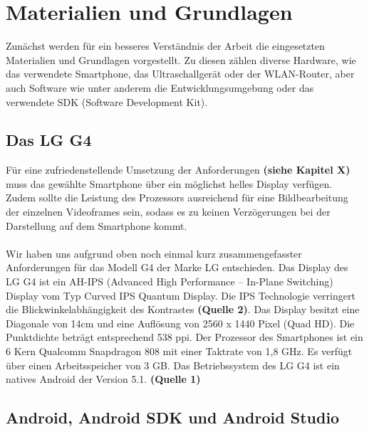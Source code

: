 \chapter{Materialien und Grundlagen}

Zunächst werden für ein besseres Verständnis der Arbeit die eingesetzten Materialien und Grundlagen vorgestellt. Zu diesen zählen diverse Hardware, wie das verwendete Smartphone, das Ultraschallgerät oder der WLAN-Router, aber auch Software wie unter anderem die Entwicklungsumgebung oder das verwendete SDK (Software Development Kit). 

\section{Das LG G4}

Für eine zufriedenstellende Umsetzung der Anforderungen \textbf{(siehe Kapitel X)} muss das gewählte Smartphone über ein möglichst helles Display verfügen. Zudem sollte die Leistung des Prozessors ausreichend für eine Bildbearbeitung der einzelnen Videoframes sein, sodass es zu keinen Verzögerungen bei der Darstellung auf dem Smartphone kommt.
\\ 
\\
Wir haben uns aufgrund oben noch einmal kurz zusammengefasster Anforderungen für das Modell G4 der Marke LG entschieden.  Das Display des LG G4 ist ein AH-IPS (Advanced High Performance – In-Plane Switching) Display vom Typ Curved IPS Quantum Display. Die IPS Technologie verringert die Blickwinkelabhängigkeit des Kontrastes \textbf{(Quelle 2)}. Das Display besitzt eine Diagonale von 14cm und eine Auflösung von 2560 x 1440 Pixel (Quad HD). Die Punktdichte beträgt entsprechend 538 ppi. Der Prozessor des Smartphones ist ein 6 Kern Qualcomm Snapdragon 808 mit einer Taktrate von 1,8 GHz. Es verfügt über einen Arbeitsspeicher von 3 GB. Das Betriebssystem des LG G4 ist ein natives Android der Version 5.1. \textbf{(Quelle 1)} 

\section{Android, Android SDK und Android Studio}

